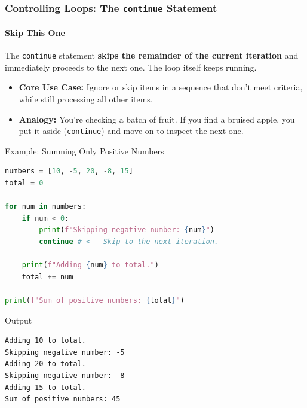 \documentclass{beamer}
\begin{document}
\begin{frame}[fragile]
    \frametitle{Controlling Loops: The \texttt{continue} Statement}
    \framesubtitle{Skip This One}
    
    The \texttt{continue} statement \textbf{skips the remainder of the current iteration} and immediately proceeds to the next one. The loop itself keeps running.
    
    \begin{itemize}
        \item \textbf{Core Use Case:} Ignore or skip items in a sequence that don't meet criteria, while still processing all other items.
        \item \textbf{Analogy:} You're checking a batch of fruit. If you find a bruised apple, you put it aside (\texttt{continue}) and move on to inspect the next one.
    \end{itemize}
    
    \begin{block}{Example: Summing Only Positive Numbers}
        \begin{lstlisting}[language=Python]
numbers = [10, -5, 20, -8, 15]
total = 0

for num in numbers:
    if num < 0:
        print(f"Skipping negative number: {num}")
        continue # <-- Skip to the next iteration.
    
    print(f"Adding {num} to total.")
    total += num
    
print(f"Sum of positive numbers: {total}")
        \end{lstlisting}
    \end{block}
    
    \begin{block}{Output}
        \begin{verbatim}
Adding 10 to total.
Skipping negative number: -5
Adding 20 to total.
Skipping negative number: -8
Adding 15 to total.
Sum of positive numbers: 45
        \end{verbatim}
    \end{block}
    
\end{frame}
\end{document}
